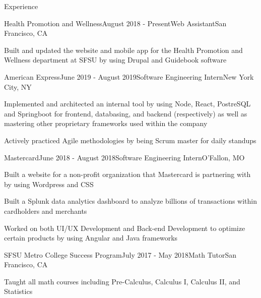 \documentclass{resume} %
\begin{document}
\begin{rSection}{Experience}

\begin{rSubsection}{Health Promotion and Wellness}{August 2018 - Present}{Web Assistant}{San Francisco, CA}
\item Built and updated the website and mobile app for the Health Promotion and Wellness department at SFSU by using Drupal and Guidebook software 
\end{rSubsection}

\begin{rSubsection}{American Express}{June 2019 - August 2019}{Software Engineering Intern}{New York City, NY}
\item Implemented and architected an internal tool by using Node, React, PostreSQL and Springboot for frontend, databasing, and backend (respectively) as well as mastering other proprietary frameworks used within the company
\item Actively practiced Agile methodologies by being Scrum master for daily standups
\end{rSubsection}


\begin{rSubsection}{Mastercard}{June 2018 - August 2018}{Software Engineering Intern}{O'Fallon, MO}
\item Built a website for a non-profit organization that Mastercard is partnering with by using Wordpress and CSS
\item Built a Splunk data analytics dashboard to analyze billions of transactions within cardholders and merchants
\item Worked on both UI/UX Development and Back-end Development to optimize certain  products by using Angular and Java frameworks

\end{rSubsection}
\begin{rSubsection}{SFSU Metro College Success Program}{July 2017 - May 2018}{Math Tutor}{San Francisco, CA}
\item Taught all math courses including Pre-Calculus, Calculus I, Calculus II, and Statistics
\end{rSubsection}




\end{rSection}
\end{document}
